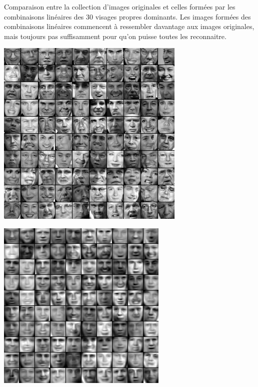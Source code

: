\begin{adjmulticols}{1}{0in}{-2in}
\begin{center}
\begin{minipage}{0.4\textwidth}
Comparaison entre la collection d'images originales
et celles formées par les combinaisons linéaires des
30 visages propres dominants.  Les images formées des combinaisons
linéaires commencent à ressembler davantage aux images originales,
mais toujours pas suffisamment pour qu'on puisse toutes les reconnaitre.
\end{minipage}
\hfill
\begin{minipage}{0.45\textwidth}
\includegraphics[width=\linewidth]{./images/faces}
\end{minipage}
\hfill
\begin{minipage}{0.45\textwidth}
\includegraphics[width=\linewidth]{./images/faces30}

\end{minipage}
\end{center}
\end{adjmulticols}
